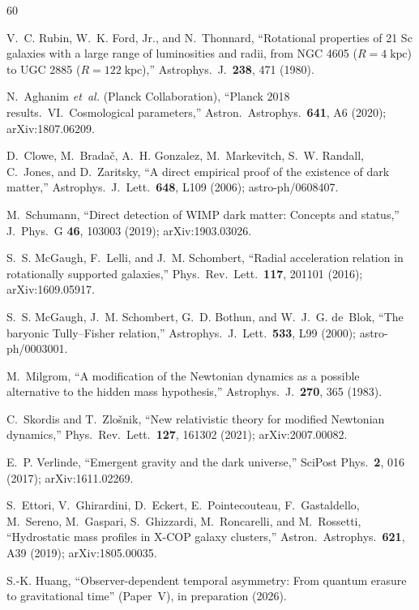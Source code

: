 \documentclass[prd,twocolumn,superscriptaddress,longbibliography,floatfix]{revtex4-2}
\begin{document}
\begin{thebibliography}{60}

V.~C. Rubin, W.~K. Ford, Jr., and N.~Thonnard,
``Rotational properties of 21 Sc galaxies with a large range
of luminosities and radii, from NGC 4605 ($R = 4\;\mathrm{kpc}$)
to UGC 2885 ($R = 122\;\mathrm{kpc}$),''
Astrophys.\ J.\ \textbf{238}, 471 (1980).

N.~Aghanim \emph{et~al.} (Planck Collaboration),
``Planck 2018 results.\ VI.\ Cosmological parameters,''
Astron.\ Astrophys.\ \textbf{641}, A6 (2020);
arXiv:1807.06209.

D.~Clowe, M.~Brada\v{c}, A.~H. Gonzalez, M.~Markevitch,
S.~W. Randall, C.~Jones, and D.~Zaritsky,
``A direct empirical proof of the existence of dark matter,''
Astrophys.\ J.\ Lett.\ \textbf{648}, L109 (2006);
astro-ph/0608407.

M.~Schumann,
``Direct detection of WIMP dark matter: Concepts and status,''
J.\ Phys.\ G \textbf{46}, 103003 (2019);
arXiv:1903.03026.

S.~S. McGaugh, F.~Lelli, and J.~M. Schombert,
``Radial acceleration relation in rotationally supported
galaxies,''
Phys.\ Rev.\ Lett.\ \textbf{117}, 201101 (2016);
arXiv:1609.05917.

S.~S. McGaugh, J.~M. Schombert, G.~D. Bothun, and
W.~J.~G. de~Blok,
``The baryonic Tully--Fisher relation,''
Astrophys.\ J.\ Lett.\ \textbf{533}, L99 (2000);
astro-ph/0003001.

M.~Milgrom,
``A modification of the Newtonian dynamics as a possible
alternative to the hidden mass hypothesis,''
Astrophys.\ J.\ \textbf{270}, 365 (1983).

C.~Skordis and T.~Zlo\v{s}nik,
``New relativistic theory for modified Newtonian dynamics,''
Phys.\ Rev.\ Lett.\ \textbf{127}, 161302 (2021);
arXiv:2007.00082.

E.~P. Verlinde,
``Emergent gravity and the dark universe,''
SciPost Phys.\ \textbf{2}, 016 (2017);
arXiv:1611.02269.

S.~Ettori, V.~Ghirardini, D.~Eckert, E.~Pointecouteau,
F.~Gastaldello, M.~Sereno, M.~Gaspari, S.~Ghizzardi,
M.~Roncarelli, and M.~Rossetti,
``Hydrostatic mass profiles in X-COP galaxy clusters,''
Astron.\ Astrophys.\ \textbf{621}, A39 (2019);
arXiv:1805.00035.

S.-K. Huang,
``Observer-dependent temporal asymmetry: From quantum erasure
to gravitational time'' (Paper~V), in preparation (2026).


\end{thebibliography}
\end{document}
